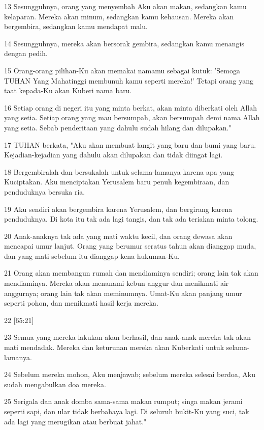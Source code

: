 \par 13 Sesungguhnya, orang yang menyembah Aku akan makan, sedangkan kamu kelaparan. Mereka akan minum, sedangkan kamu kehausan. Mereka akan bergembira, sedangkan kamu mendapat malu.
\par 14 Sesungguhnya, mereka akan bersorak gembira, sedangkan kamu menangis dengan pedih.
\par 15 Orang-orang pilihan-Ku akan memakai namamu sebagai kutuk: 'Semoga TUHAN Yang Mahatinggi membunuh kamu seperti mereka!' Tetapi orang yang taat kepada-Ku akan Kuberi nama baru.
\par 16 Setiap orang di negeri itu yang minta berkat, akan minta diberkati oleh Allah yang setia. Setiap orang yang mau bersumpah, akan bersumpah demi nama Allah yang setia. Sebab penderitaan yang dahulu sudah hilang dan dilupakan."
\par 17 TUHAN berkata, "Aku akan membuat langit yang baru dan bumi yang baru. Kejadian-kejadian yang dahulu akan dilupakan dan tidak diingat lagi.
\par 18 Bergembiralah dan bersukalah untuk selama-lamanya karena apa yang Kuciptakan. Aku menciptakan Yerusalem baru penuh kegembiraan, dan penduduknya bersuka ria.
\par 19 Aku sendiri akan bergembira karena Yerusalem, dan bergirang karena penduduknya. Di kota itu tak ada lagi tangis, dan tak ada teriakan minta tolong.
\par 20 Anak-anaknya tak ada yang mati waktu kecil, dan orang dewasa akan mencapai umur lanjut. Orang yang berumur seratus tahun akan dianggap muda, dan yang mati sebelum itu dianggap kena hukuman-Ku.
\par 21 Orang akan membangun rumah dan mendiaminya sendiri; orang lain tak akan mendiaminya. Mereka akan menanami kebun anggur dan menikmati air anggurnya; orang lain tak akan meminumnya. Umat-Ku akan panjang umur seperti pohon, dan menikmati hasil kerja mereka.
\par 22 [65:21]
\par 23 Semua yang mereka lakukan akan berhasil, dan anak-anak mereka tak akan mati mendadak. Mereka dan keturunan mereka akan Kuberkati untuk selama-lamanya.
\par 24 Sebelum mereka mohon, Aku menjawab; sebelum mereka selesai berdoa, Aku sudah mengabulkan doa mereka.
\par 25 Serigala dan anak domba sama-sama makan rumput; singa makan jerami seperti sapi, dan ular tidak berbahaya lagi. Di seluruh bukit-Ku yang suci, tak ada lagi yang merugikan atau berbuat jahat."

